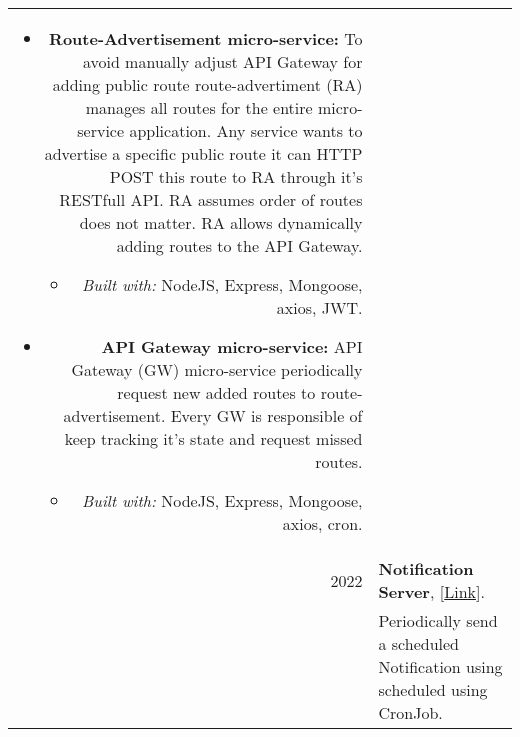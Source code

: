 \documentclass[a4paper,10pt]{article}
\begin{document}
\begin{longtable}{r p{16cm}}
\begin{itemize}
\begin{itemize}
            \end{itemize}
        \end{itemize}
        \begin{itemize}
            \item \textbf{Route-Advertisement micro-service:}
            To avoid manually adjust API Gateway for adding public route route-advertiment (RA) manages all routes for the entire micro-service application. Any service wants to advertise a specific public route it can HTTP POST this route to RA through it's RESTfull API. RA assumes order of routes does not matter. RA allows dynamically adding routes to the API Gateway.
            \begin{itemize}
                \item \textit{Built with: }NodeJS, Express, Mongoose, axios, JWT.
            \end{itemize} 
        \end{itemize}
        \begin{itemize}
            \item \textbf{API Gateway micro-service:}
            API Gateway (GW) micro-service periodically request new added routes to route-advertisement. Every GW is responsible of keep tracking it's state and request missed routes.
            \begin{itemize}
                \item \textit{Built with: }NodeJS, Express, Mongoose, axios, cron.
            \end{itemize} 
        \end{itemize}\\

        2022  & \textbf{Notification Server}, [\href{https://github.com/zaky-fetoh/Learning-Backend-Development-Using-NodeJS/tree/main/Day10_NotificationSerWithCronJob}{Link}].\\&
        Periodically send a scheduled Notification using scheduled using CronJob. \\
    \end{longtable}
\label{LastPage}
\end{document}
